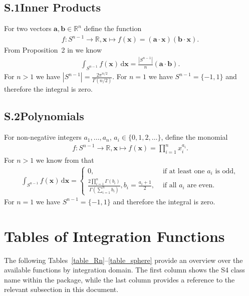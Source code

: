 \documentclass[11pt]{article}
\def\R{\mathbb{R}}
\def\d{\,\mathrm{d}}
\newcommand{\abs}[1]{\left|#1\right|}
\def\bx{\mathbf{x}}
\def\ba{\mathbf{a}}
\def\bb{\mathbf{b}}
\begin{document}
\subsection*{S.1\hspace{0.5cm}Inner Products}
For two vectors $\ba,\bb\in\R^n$ define the function
\begin{align*}
f\colon S^{n-1}\to\R, \bx \mapsto f(\bx) = (\ba\cdot\bx)(\bb\cdot\bx).
\end{align*}
From Proposition~2 in \cite{KhanPinsky2003} we know
\begin{align*}
\int_{S^{n-1}} f(\bx) \d\bx = \frac{\abs{S^{n-1}}}{n}(\ba\cdot\bb).
\end{align*}
For $n > 1$ we have $\abs{S^{n-1}} = \frac{2\pi^{n/2}}{\Gamma(n/2)}$.
For $n=1$ we have $S^{n-1} = \{-1,1\}$ and therefore the integral is zero.
%
%
%
\subsection*{S.2\hspace{0.5cm}Polynomials}
For non-negative integers $a_1,\ldots,a_n$, $a_i\in\{0,1,2,\ldots\}$, define the monomial
\begin{align*}
f\colon S^{n-1}\to\R, \bx \mapsto f(\bx) = \prod_{i=1}^{n}x_i^{a_i}.
\end{align*}
For $n >1$ we know from \cite{Folland2001} that
\begin{align*}
\int_{S^{n-1}} f(\bx) \d\bx =
\begin{cases}
0, &\text{ if at least one $a_i$ is odd},\\
\frac{2\prod_{i=1}^{n}\Gamma(b_i)}{\Gamma(\sum^{n}_{i=1}b_i)}, b_i = \frac{a_i+1}{2}, &\text{ if all $a_i$ are even}.
\end{cases}
\end{align*}
For $n=1$ we have $S^{n-1} = \{-1,1\}$ and therefore the integral is zero.
%
%
%
\section*{Tables of Integration Functions}
The following Tables~\ref{table_Rn}--\ref{table_sphere} provide an overview over the available functions by integration domain.
The first column shows the S4 class name within the package, while the last column provides a reference to the relevant subsection in this document.
\end{document}
